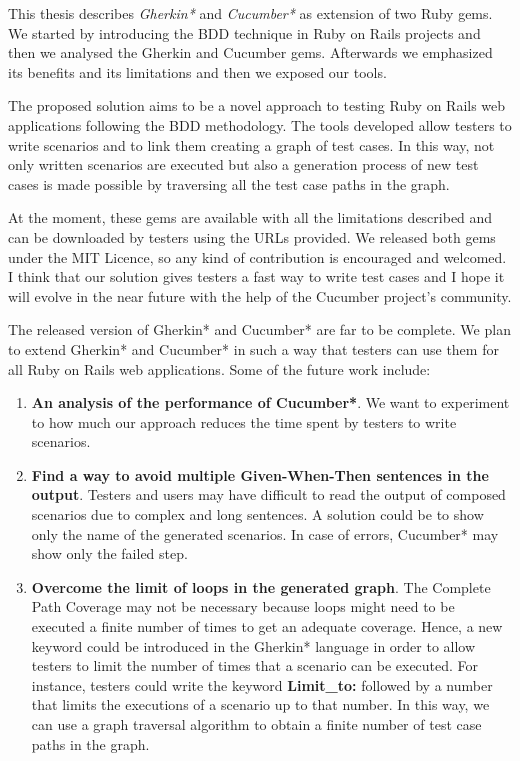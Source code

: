 
This thesis describes \textit{Gherkin*} and \textit{Cucumber*} as extension of two Ruby gems. We started by introducing the BDD technique in Ruby on Rails projects and then we analysed the Gherkin and Cucumber gems. Afterwards we emphasized its benefits and its limitations and then we exposed our tools.

The proposed solution aims to be a novel approach to testing Ruby on Rails web applications following the BDD methodology. The tools developed allow testers to write scenarios and to link them creating a graph of test cases. In this way, not only written scenarios are executed but also a generation process of new test cases is made possible by traversing all the test case paths in the graph.

At the moment, these gems are available with all the limitations described and can be downloaded by testers using the URLs provided. We released both gems under the MIT Licence, so any kind of contribution is encouraged and welcomed. I think that our solution gives testers a fast way to write test cases and I hope it will evolve in the near future with the help of the Cucumber project's community.

The released version of Gherkin* and Cucumber* are far to be complete. We plan to extend Gherkin* and Cucumber* in such a way that testers can use them for all Ruby on Rails web applications. Some of the future work include:

\begin{enumerate}
\item \textbf{An analysis of the performance of Cucumber*}. We want to experiment to how much our approach reduces the time spent by testers to write scenarios.
\item \textbf{Find a way to avoid multiple Given-When-Then sentences in the output}. Testers and users may have difficult to read the output of composed scenarios due to complex and long sentences. A solution could be to show only the name of the generated scenarios. In case of errors, Cucumber* may show only the failed step.
\item \textbf{Overcome the limit of loops in the generated graph}. The Complete Path Coverage may not be necessary because loops might need to be executed a finite number of times to get an adequate coverage. Hence, a new keyword could be introduced in the Gherkin* language in order to allow testers to limit the number of times that a scenario can be executed. For instance, testers could write the keyword \textbf{Limit\_to:} followed by a number that limits the executions of a scenario up to that number. In this way, we can use a graph traversal algorithm to obtain a finite number of test case paths in the graph.
\end{enumerate}

